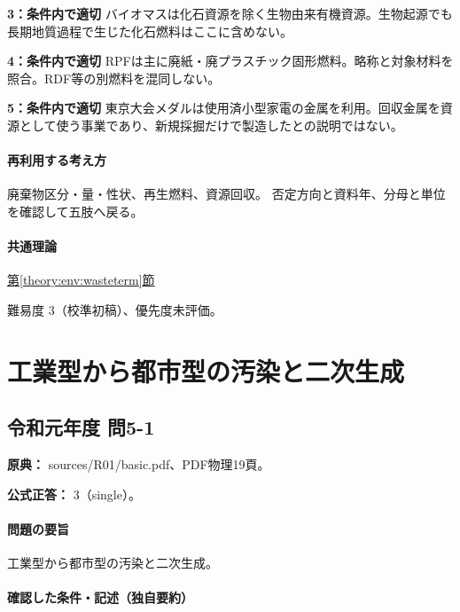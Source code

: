 \noindent\textbf{3：条件内で適切} バイオマスは化石資源を除く生物由来有機資源。生物起源でも長期地質過程で生じた化石燃料はここに含めない。\par

\noindent\textbf{4：条件内で適切} RPFは主に廃紙・廃プラスチック固形燃料。略称と対象材料を照合。RDF等の別燃料を混同しない。\par

\noindent\textbf{5：条件内で適切} 東京大会メダルは使用済小型家電の金属を利用。回収金属を資源として使う事業であり、新規採掘だけで製造したとの説明ではない。\par

\paragraph{再利用する考え方} 廃棄物区分・量・性状、再生燃料、資源回収。 否定方向と資料年、分母と単位を確認して五肢へ戻る。

\paragraph{共通理論} \hyperref[theory:env:wasteterm]{第\ref*{theory:env:wasteterm}節}

\par 難易度 3（校準初稿）、優先度未評価。

\section{工業型から都市型の汚染と二次生成}

\subsection{令和元年度 問5-1}
\label{q:r01-reg-basic-5-1}

\noindent\textbf{原典：} sources/R01/basic.pdf、PDF物理19頁。

\textbf{公式正答：} 3（single）。

\paragraph{問題の要旨} 工業型から都市型の汚染と二次生成。

\paragraph{確認した条件・記述（独自要約）}\mbox{}\par

